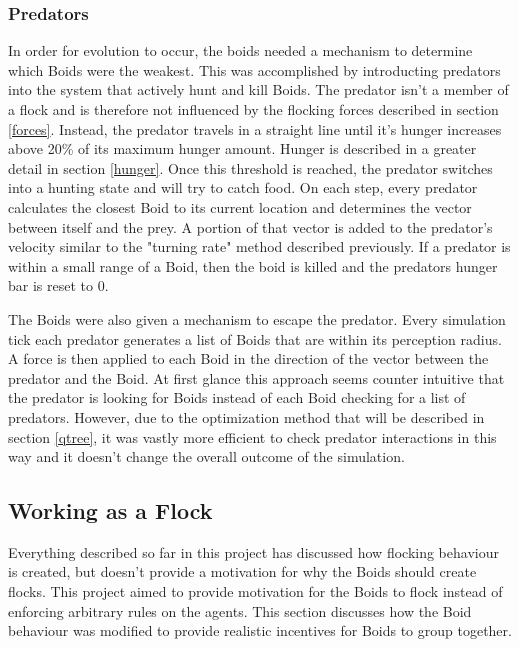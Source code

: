\documentclass{egpubl}
\begin{document}
\subsubsection{Predators}
\label{hunting}
In order for evolution to occur, the boids needed a mechanism to determine which Boids were the weakest. This was accomplished by introducting predators into the system that actively hunt and kill Boids. The predator isn't a member of a flock and is therefore not influenced by the flocking forces described in section \ref{forces}. Instead, the predator travels in a straight line until it's hunger increases above 20\% of its maximum hunger amount. Hunger is described in a greater detail in section \ref{hunger}. Once this threshold is reached, the predator switches into a hunting state and will try to catch food. On each step, every predator calculates the closest Boid to its current location and determines the vector between itself and the prey. A portion of that vector is added to the predator's velocity similar to the "turning rate" method described previously. If a predator is within a small range of a Boid, then the boid is killed and the predators hunger bar is reset to 0. 
\par
The Boids were also given a mechanism to escape the predator. Every simulation tick each predator generates a list of Boids that are within its perception radius. A force is then applied to each Boid in the direction of the vector between the predator and the Boid. At first glance this approach seems counter intuitive that the predator is looking for Boids instead of each Boid checking for a list of predators. However, due to the optimization method that will be described in section \ref{qtree}, it was vastly more efficient to check predator interactions in this way and it doesn't change the overall outcome of the simulation.
\subsection{Working as a Flock}
Everything described so far in this project has discussed how flocking behaviour is created, but doesn't provide a motivation for why the Boids should create flocks. This project aimed to provide motivation for the Boids to flock instead of enforcing arbitrary rules on the agents. This section discusses how the Boid behaviour was modified to provide realistic incentives for Boids to group together.
\end{document}
